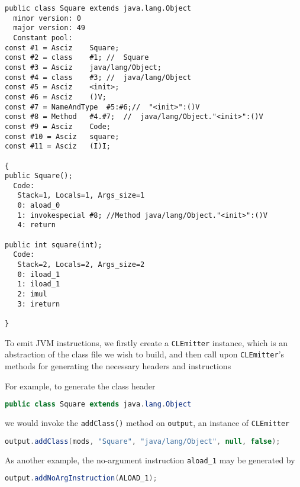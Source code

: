 \documentclass[8pt,a4paper,compress]{beamer}
\begin{document}
\begin{frame}[fragile]
\pause

\begin{lstlisting}[language={},style=focusin]
public class Square extends java.lang.Object
  minor version: 0
  major version: 49
  Constant pool:
const #1 = Asciz    Square;
const #2 = class    #1; //  Square
const #3 = Asciz    java/lang/Object;
const #4 = class    #3; //  java/lang/Object
const #5 = Asciz    <init>;
const #6 = Asciz    ()V;
const #7 = NameAndType  #5:#6;//  "<init>":()V
const #8 = Method   #4.#7;  //  java/lang/Object."<init>":()V
const #9 = Asciz    Code;
const #10 = Asciz   square;
const #11 = Asciz   (I)I;

{
public Square();
  Code:
   Stack=1, Locals=1, Args_size=1
   0: aload_0
   1: invokespecial #8; //Method java/lang/Object."<init>":()V
   4: return

public int square(int);
  Code:
   Stack=2, Locals=2, Args_size=2
   0: iload_1
   1: iload_1
   2: imul
   3: ireturn

}
\end{lstlisting}
\end{frame}

\begin{frame}[fragile]
\pause

To emit JVM instructions, we firstly create a \lstinline{CLEmitter} instance, which is an abstraction of the class file we wish to build, and then call upon \lstinline{CLEmitter}'s methods for generating the necessary headers and instructions

\pause
\bigskip

For example, to generate the class header

\smallskip

\begin{lstlisting}[language=Java,style=focusin]
public class Square extends java.lang.Object
\end{lstlisting}

\smallskip

we would invoke the \lstinline{addClass()} method on \lstinline{output}, an instance of \lstinline{CLEmitter}

\smallskip

\begin{lstlisting}[language=Java,style=focusin]
output.addClass(mods, "Square", "java/lang/Object", null, false);
\end{lstlisting}

\pause
\bigskip

As another example, the no-argument instruction \lstinline{aload_1} may be generated by

\smallskip

\begin{lstlisting}[language=Java,style=focusin]
output.addNoArgInstruction(ALOAD_1);
\end{lstlisting}
\end{frame}
\end{document}
